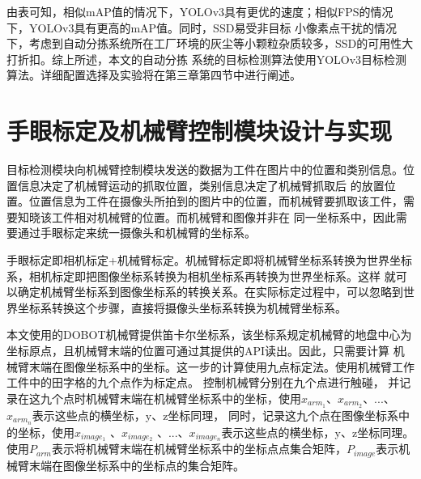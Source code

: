 由表可知，相似mAP值的情况下，YOLOv3具有更优的速度；相似FPS的情况下，YOLOv3具有更高的mAP值。同时，SSD易受非目标
小像素点干扰的情况下，考虑到自动分拣系统所在工厂环境的灰尘等小颗粒杂质较多，SSD的可用性大打折扣。综上所述，本文的自动分拣
系统的目标检测算法使用YOLOv3目标检测算法。详细配置选择及实验将在第三章第四节中进行阐述。


\section{手眼标定及机械臂控制模块设计与实现}

目标检测模块向机械臂控制模块发送的数据为工件在图片中的位置和类别信息。位置信息决定了机械臂运动的抓取位置，类别信息决定了机械臂抓取后
的放置位置。位置信息为工件在摄像头所拍到的图片中的位置，而机械臂要抓取该工件，需要知晓该工件相对机械臂的位置。而机械臂和图像并非在
同一坐标系中，因此需要通过手眼标定来统一摄像头和机械臂的坐标系。

手眼标定即相机标定+机械臂标定。机械臂标定即将机械臂坐标系转换为世界坐标系，相机标定即把图像坐标系转换为相机坐标系再转换为世界坐标系。这样
就可以确定机械臂坐标系到图像坐标系的转换关系。在实际标定过程中，可以忽略到世界坐标系转换这个步骤，直接将摄像头坐标系转换为机械臂坐标系。

本文使用的DOBOT机械臂提供笛卡尔坐标系，该坐标系规定机械臂的地盘中心为坐标原点，且机械臂末端的位置可通过其提供的API读出。因此，只需要计算
机械臂末端在图像坐标系中的坐标。这一步的计算使用九点标定法。使用机械臂工作工件中的田字格的九个点作为标定点。
控制机械臂分别在九个点进行触碰，
并记录在这九个点时机械臂末端在机械臂坐标系中的坐标，使用$x_{arm_{1}}$、$x_{arm_{2}}$、...、$x_{arm_{n}}$表示这些点的横坐标，y、z坐标同理，
同时，记录这九个点在图像坐标系中的坐标，使用$x_{image_{1}}$ 、$x_{image_{2}}$ 、...、$x_{image_{n}}$表示这些点的横坐标，y、z坐标同理。
使用$P_{arm}$表示将机械臂末端在机械臂坐标系中的坐标点点集合矩阵，$P_{image}$表示机械臂末端在图像坐标系中的坐标点的集合矩阵。


